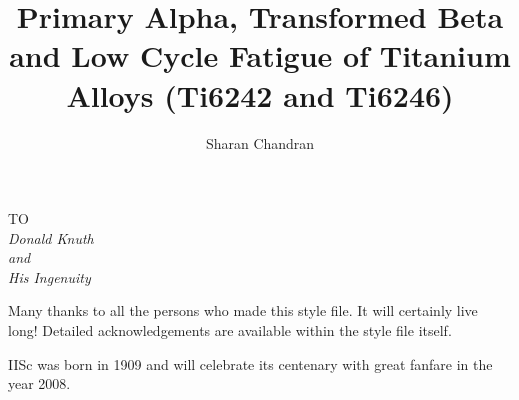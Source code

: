 \documentclass[12pt]{iiscthes} %
\begin{document}
\begin{frontmatter}

\title{Primary Alpha, Transformed Beta and Low Cycle Fatigue of Titanium Alloys (Ti6242 and Ti6246)}
\author{Sharan Chandran}
\enggfaculty
\iisclogotrue %
\tablespagetrue %
\maketitle


\begin{dedication}
\begin{center}
TO \\[2em]
\large\it Donald Knuth\\
and\\
\large\it His Ingenuity 
\end{center}
\end{dedication}
\acknowledgements

Many thanks to all the persons who made this style file. It will certainly
live long! Detailed acknowledgements are available within the style file itself.

\vita
IISc was born in 1909 and will celebrate its centenary with great fanfare
in the year 2008.
\publications


\end{frontmatter}
\end{document}
